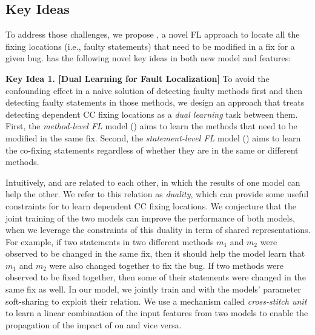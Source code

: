 \subsection{Key Ideas}
\label{sec:key-ideas}

To address those challenges, we propose {\tool}, a novel FL approach
to locate all the fixing locations (i.e., faulty statements) that need
to be modified in a fix for a given bug. {\tool} has the following
novel key ideas in both new model and features:

{\bf Key Idea 1. [Dual Learning for Fault Localization]} To avoid the
confounding effect in a naive solution of detecting faulty methods
first and then detecting faulty statements in those methods, we design
an approach that treats detecting dependent CC fixing locations as a
{\em dual learning} task between them. First, the {\em method-level
  FL} model () aims to learn the methods that need
to be modified in the same fix. Second, the {\em statement-level
  FL} model () aims to learn the co-fixing
statements regardless of whether they are in the same or different
methods.

Intuitively,  and  are related to each
other, in which the results of one model can help the other. We refer
to this relation as {\em duality}, which can provide some useful
constraints for {\tool} to learn dependent CC fixing locations.
%
We conjecture that the joint training of the two models can improve
the performance of both models, when we leverage the constraints of
this duality in term of shared representations. For example, if two
statements in two different methods $m_1$ and $m_2$ were observed to
be changed in the same fix, then it should help the model learn that
$m_1$ and $m_2$ were also changed together to fix the bug.  If two
methods were observed to be fixed together, then some of their
statements were changed in the same fix as well. In our model, we
jointly train  and  with the models'
parameter soft-sharing to exploit their relation. We use a mechanism
called {\em cross-stitch unit} to learn a linear combination of the
input features from two models to enable the propagation of the impact
of  on  and vice versa.




